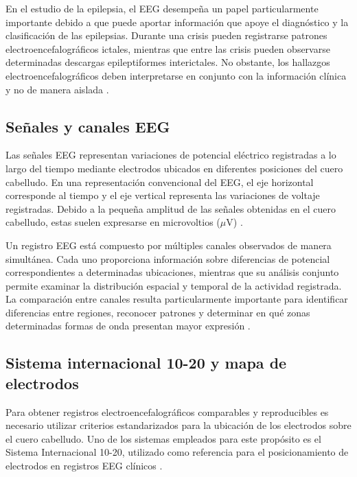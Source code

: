 En el estudio de la epilepsia, el EEG desempeña un papel particularmente
importante debido a que puede aportar información que apoye el diagnóstico
y la clasificación de las epilepsias. Durante una crisis pueden registrarse
patrones electroencefalográficos ictales, mientras que entre las crisis
pueden observarse determinadas descargas epileptiformes interictales. No
obstante, los hallazgos electroencefalográficos deben interpretarse en
conjunto con la información clínica y no de manera aislada
\citep{NoachtarRemi2009,StLouisFrey2016EEG}.

\subsection{Señales y canales EEG}
\label{subsec:senales-canales-eeg}

Las señales EEG representan variaciones de potencial eléctrico registradas a
lo largo del tiempo mediante electrodos ubicados en diferentes posiciones del
cuero cabelludo. En una representación convencional del EEG, el eje horizontal
corresponde al tiempo y el eje vertical representa las variaciones de voltaje
registradas. Debido a la pequeña amplitud de las señales obtenidas en el cuero
cabelludo, estas suelen expresarse en microvoltios ($\mu$V)
\citep{StLouisFrey2016EEG}.

Un registro EEG está compuesto por múltiples canales observados de manera
simultánea. Cada uno proporciona información sobre diferencias de potencial
correspondientes a determinadas ubicaciones, mientras que su análisis conjunto
permite examinar la distribución espacial y temporal de la actividad
registrada. La comparación entre canales resulta particularmente importante
para identificar diferencias entre regiones, reconocer patrones y determinar
en qué zonas determinadas formas de onda presentan mayor expresión
\citep{StLouisFrey2016EEG}.

\subsection{Sistema internacional 10-20 y mapa de electrodos}
\label{subsec:sistema-10-20}

Para obtener registros electroencefalográficos comparables y reproducibles
es necesario utilizar criterios estandarizados para la ubicación de los
electrodos sobre el cuero cabelludo. Uno de los sistemas empleados para este
propósito es el Sistema Internacional 10-20, utilizado como referencia para
el posicionamiento de electrodos en registros EEG clínicos
\citep{Acharya2016ElectrodeNomenclature}.

